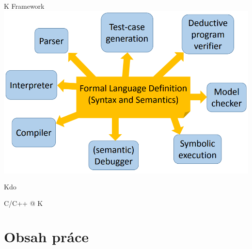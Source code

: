 \documentclass[11pt]{beamer}
\begin{document}



\begin{frame}{K Framework}
\includegraphics[width=1.0\linewidth]{img/kidea.png}
\end{frame}

\begin{frame}{Kdo}

\end{frame}

\begin{frame}{C/C++ @ K}

\end{frame}

\section{Obsah práce}



\end{document}
